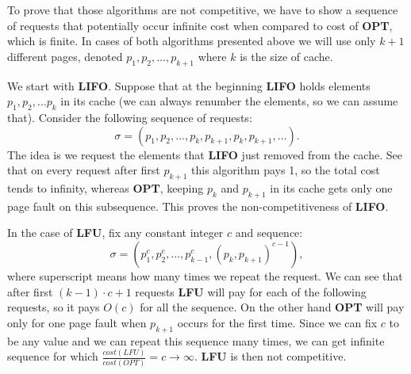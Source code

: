 To prove that those algorithms are not competitive, we have to show a sequence 
of requests that potentially occur infinite cost when compared to cost of 
\textbf{OPT}, which is finite. In cases of both algorithms presented above we 
will use only 
$k+1$ different pages, denoted $p_1, p_2, \ldots, p_{k+1}$ where $k$ is the 
size of cache.

We start with \textbf{LIFO}. Suppose that at the beginning \textbf{LIFO} holds
elements $p_1, p_2, \ldots p_k$ in its cache (we can always renumber the 
elements, so we can 
assume that). Consider the following sequence of requests:
$$ \sigma = (p_1, p_2, \ldots, p_k, p_{k+1}, p_k, p_{k+1}, \ldots).$$
The idea is we request the elements that \textbf{LIFO} just removed from the 
cache. See that on every request after first $p_{k+1}$ this algorithm pays 1, 
so the total cost tends to infinity, whereas \textbf{OPT}, keeping $p_k$ 
and $p_{k+1}$ in its cache gets only one page fault on this subsequence. 
This proves the non-competitiveness of \textbf{LIFO}.

In the case of \textbf{LFU}, fix any constant integer $c$ and sequence:
$$\sigma = (p_1^c, p_2^c, \ldots, p_{k-1}^c, (p_k, p_{k+1})^{c-1}),$$
where superscript means how many times we repeat the request. We can see that 
after first $(k-1) \cdot c + 1$ requests \textbf{LFU} will pay for each of the 
following requests, so it pays $O(c)$ for all the sequence. On the other hand 
\textbf{OPT} will pay only for one page fault when $p_{k+1}$ occurs for the 
first time. Since we can fix $c$ to be any value and we can repeat this 
sequence many times, we can get infinite sequence for which 
$\frac{cost(LFU)}{cost(OPT)} = c \rightarrow \infty$. 
\textbf{LFU} is then not competitive.
